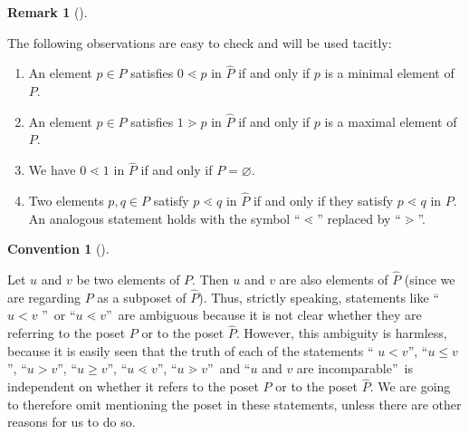 \documentclass[numbers=enddot,12pt,final,onecolumn,notitlepage]{scrartcl}%
\theoremstyle{definition}
\newtheorem{remk}[theo]{Remark}
\newenvironment{remark}[1][]
{\begin{remk}[#1]\begin{leftbar}}
{\end{leftbar}\end{remk}}
\newtheorem{conv}[theo]{Convention}
\newenvironment{convention}[1][]
{\begin{conv}[#1]\begin{leftbar}}
{\end{leftbar}\end{conv}}
\newenvironment{verlong}{}{}
\begin{document}
\begin{verlong}


\begin{remark}
\label{rmk.Phat.covers} The following observations are easy to check and will
be used tacitly:

\begin{enumerate}
\item[\textbf{(a)}] An element $p\in P$ satisfies $0\lessdot p$ in
$\widehat{P}$ if and only if $p$ is a minimal element of $P$.

\item[\textbf{(b)}] An element $p\in P$ satisfies $1\gtrdot p$ in
$\widehat{P}$ if and only if $p$ is a maximal element of $P$.

\item[\textbf{(c)}] We have $0\lessdot1$ in $\widehat{P}$ if and only if
$P=\varnothing$.

\item[\textbf{(d)}] Two elements $p, q \in P$ satisfy $p \lessdot q$ in
$\widehat{P}$ if and only if they satisfy $p \lessdot q$ in $P$. An analogous
statement holds with the symbol ``$\lessdot$'' replaced by ``$\gtrdot$''.
\end{enumerate}
\end{remark}

\begin{convention}
Let $u$ and $v$ be two elements of $P$. Then $u$ and $v$ are also elements of
$\widehat{P}$ (since we are regarding $P$ as a subposet of $\widehat{P}$).
Thus, strictly speaking, statements like \textquotedblleft$u<v$%
\textquotedblright\ or \textquotedblleft$u\lessdot v$\textquotedblright\ are
ambiguous because it is not clear whether they are referring to the poset $P$
or to the poset $\widehat{P}$. However, this ambiguity is harmless, because it
is easily seen that the truth of each of the statements \textquotedblleft%
$u<v$\textquotedblright, \textquotedblleft$u\leq v$\textquotedblright,
\textquotedblleft$u>v$\textquotedblright, \textquotedblleft$u\geq
v$\textquotedblright, \textquotedblleft$u\lessdot v$\textquotedblright,
\textquotedblleft$u\gtrdot v$\textquotedblright\ and \textquotedblleft$u$ and
$v$ are incomparable\textquotedblright\ is independent on whether it refers to
the poset $P$ or to the poset $\widehat{P}$. We are going to therefore omit
mentioning the poset in these statements, unless there are other reasons for
us to do so.
\end{convention}
\end{verlong}
\end{document}
